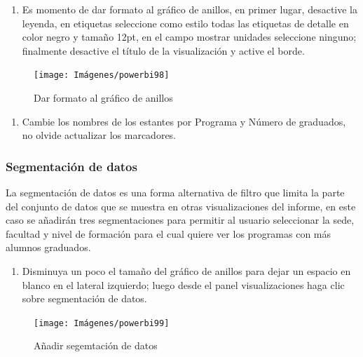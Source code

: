\documentclass[
]{book}
\providecommand{\tightlist}{%
  \setlength{\itemsep}{0pt}\setlength{\parskip}{0pt}}
\begin{document}
\begin{enumerate}
\def\labelenumi{\arabic{enumi}.}
\setcounter{enumi}{3}
\tightlist
\item
  Es momento de dar formato al gráfico de anillos, en primer lugar, desactive la leyenda, en etiquetas seleccione como estilo todas las etiquetas de detalle en color negro y tamaño 12pt, en el campo mostrar unidades seleccione ninguno; finalmente desactive el título de la visualización y active el borde.
\end{enumerate}

\begin{figure}

{\centering \texttt{[image: Imágenes/powerbi98]} 

}

\caption{Dar formato al gráfico de anillos}\label{fig:paso4anillos-fig}
\end{figure}

\begin{enumerate}
\def\labelenumi{\arabic{enumi}.}
\setcounter{enumi}{4}
\tightlist
\item
  Cambie los nombres de los estantes por Programa y Número de graduados, no olvide actualizar los marcadores.
\end{enumerate}

\hypertarget{segementaciondatospowerbi}{%
\subsubsection{Segmentación de datos}\label{segementaciondatospowerbi}}

La segmentación de datos es una forma alternativa de filtro que limita la parte del conjunto de datos que se muestra en otras visualizaciones del informe, en este caso se añadirán tres segmentaciones para permitir al usuario seleccionar la sede, facultad y nivel de formación para el cual quiere ver los programas con más alumnos graduados.

\begin{enumerate}
\def\labelenumi{\arabic{enumi}.}
\tightlist
\item
  Disminuya un poco el tamaño del gráfico de anillos para dejar un espacio en blanco en el lateral izquierdo; luego desde el panel visualizaciones haga clic sobre segmentación de datos.
\end{enumerate}

\begin{figure}

{\centering \texttt{[image: Imágenes/powerbi99]} 

}

\caption{Añadir segemtación de datos}\label{fig:paso1segmentacion-fig}
\end{figure}
\end{document}
